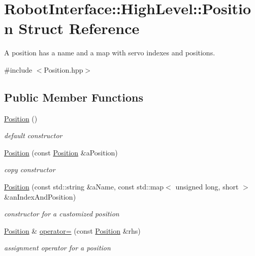 \hypertarget{structRobotInterface_1_1HighLevel_1_1Position}{}\section{Robot\+Interface\+:\+:High\+Level\+:\+:Position Struct Reference}
\label{structRobotInterface_1_1HighLevel_1_1Position}


A position has a name and a map with servo indexes and positions.  




{\ttfamily \#include $<$Position.\+hpp$>$}

\subsection*{Public Member Functions}
\begin{DoxyCompactItemize}
\item 
\hyperlink{structRobotInterface_1_1HighLevel_1_1Position_ae15509c9f30a85737604293c81666642}{Position} ()\hypertarget{structRobotInterface_1_1HighLevel_1_1Position_ae15509c9f30a85737604293c81666642}{}\label{structRobotInterface_1_1HighLevel_1_1Position_ae15509c9f30a85737604293c81666642}

\begin{DoxyCompactList}\small\item\em default constructor \end{DoxyCompactList}\item 
\hyperlink{structRobotInterface_1_1HighLevel_1_1Position_a1a4f0fc4b53e88241b065b0322b87de8}{Position} (const \hyperlink{structRobotInterface_1_1HighLevel_1_1Position}{Position} \&a\+Position)
\begin{DoxyCompactList}\small\item\em copy constructor \end{DoxyCompactList}\item 
\hyperlink{structRobotInterface_1_1HighLevel_1_1Position_a3ca42442242b970335b7d676a81e79fd}{Position} (const std\+::string \&a\+Name, const std\+::map$<$ unsigned long, short $>$ \&an\+Index\+And\+Position)
\begin{DoxyCompactList}\small\item\em constructor for a customized position \end{DoxyCompactList}\item 
\hyperlink{structRobotInterface_1_1HighLevel_1_1Position}{Position} \& \hyperlink{structRobotInterface_1_1HighLevel_1_1Position_a43a108aa14e8d158f7e07030dc8db3ec}{operator=} (const \hyperlink{structRobotInterface_1_1HighLevel_1_1Position}{Position} \&rhs)
\begin{DoxyCompactList}\small\item\em assignment operator for a position \end{DoxyCompactList}\end{DoxyCompactItemize}
